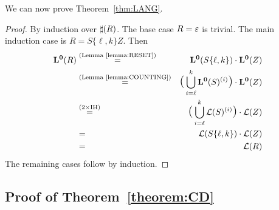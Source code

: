 We can now prove Theorem~\ref{thm:LANG}.

\begin{proof}
  By induction over $\sharp(R)$.
  The base case $R=\varepsilon$ is trivial.
  The main induction case is
  $R=S\{\ell,k\}Z$. Then
  \begin{eqnarray*}
    \mathbf{L}^{\boldsymbol{0}}(R)&\stackrel{(\textrm{Lemma~\ref{lemma:RESET}})}{=}&
    \mathbf{L}^{\boldsymbol{0}}(S\{\ell,k\}) \cdot
    \mathbf{L}^{\boldsymbol{0}}(Z) \\
    &\stackrel{(\textrm{Lemma~\ref{lemma:COUNTING}})}{=}&
    \textrm{\Large(} \bigcup_{i=\ell}^{k}\mathbf{L}^{\boldsymbol{0}}(S)^{(i)}\textrm{\Large)} \cdot
    \mathbf{L}^{\boldsymbol{0}}(Z)
    \\
    &\stackrel{(2\times \textrm{IH})}{=} &
    \textrm{\Large(} \bigcup_{i=\ell}^{k}\mathcal{L}(S)^{(i)}\textrm{\Large)} \cdot
    \mathcal{L}(Z) \\
    &=&
    \mathcal{L}(S\{\ell,k\})\cdot\mathcal{L}(Z) \\
    &=&
    \mathcal{L}(R)
  \end{eqnarray*}
  The remaining cases follow by induction.
\end{proof}

\subsection{Proof of Theorem~\ref{theorem:CD}\label{app:thmCD}}


